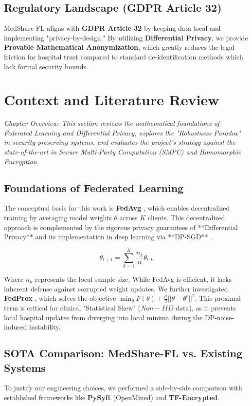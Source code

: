 \documentclass[10pt, a4paper, twocolumn]{article}
\begin{document}
\subsection{Regulatory Landscape (GDPR Article 32)}
MedShare-FL aligns with \textbf{GDPR Article 32} by keeping data local and implementing "privacy-by-design." By utilizing \textbf{Differential Privacy}, we provide \textbf{Provable Mathematical Anonymization}, which greatly reduces the legal friction for hospital trust compared to standard de-identification methods which lack formal security bounds.

\section{Context and Literature Review}
\label{sec:litreview}

\textit{Chapter Overview: This section reviews the mathematical foundations of Federated Learning and Differential Privacy, explores the "Robustness Paradox" in security-preserving systems, and evaluates the project's strategy against the state-of-the-art in Secure Multi-Party Computation (SMPC) and Homomorphic Encryption.}

\subsection{Foundations of Federated Learning}
The conceptual basis for this work is \textbf{FedAvg} \cite{mcmahan2017}, which enables decentralized training by averaging model weights $\theta$ across $K$ clients. This decentralized approach is complemented by the rigorous privacy guarantees of **Differential Privacy** \cite{dwork2006} and its implementation in deep learning via **DP-SGD** \cite{abadi2016}.

\begin{equation}
    \theta_{t+1} = \sum_{k=1}^K \frac{n_k}{n} \theta_{t,k}
\end{equation}

Where $n_k$ represents the local sample size. While FedAvg is efficient, it lacks inherent defense against corrupted weight updates. We further investigated \textbf{FedProx} \cite{li2020}, which solves the objective $\min_{\theta} F(\theta) + \frac{\mu}{2} ||\theta - \theta^t||^2$. This proximal term is critical for clinical "Statistical Skew" ($Non-IID$ data), as it prevents local hospital updates from diverging into local minima during the DP-noise-induced instability.

\subsection{SOTA Comparison: MedShare-FL vs. Existing Systems}
To justify our engineering choices, we performed a side-by-side comparison with established frameworks like \textbf{PySyft} (OpenMined) and \textbf{TF-Encrypted}.
\end{document}
